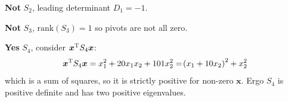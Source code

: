 \documentclass[a4paper]{article}
\begin{document}
\textbf{Not} \(S_{2}\), leading determinant \(D_{1} = -1\).

\textbf{Not} \(S_{3}\), \(\text{rank}\!\left( S_{3} \right) = 1\) so pivots are not all zero.

\textbf{Yes} \(S_{4}\), consider \(\bm{x}^{\textsc{T}}S_{4}\bm{x}\):
\[
	\bm{x}^{\textsc{T}}S_{4}\bm{x} = x^{2}_{1} + 20x_{1}x_{2} + 101x^{2}_{2} = \!\left( x_{1} + 10x_{2} \right)^{2} + x^{2}_{2}
\]
which is a sum of squares, so it is strictly positive for non-zero \(\bm{x}\). Ergo \(S_{4}\) is positive definite and has two positive eigenvalues.

\vspace{12pt}

\end{document}
